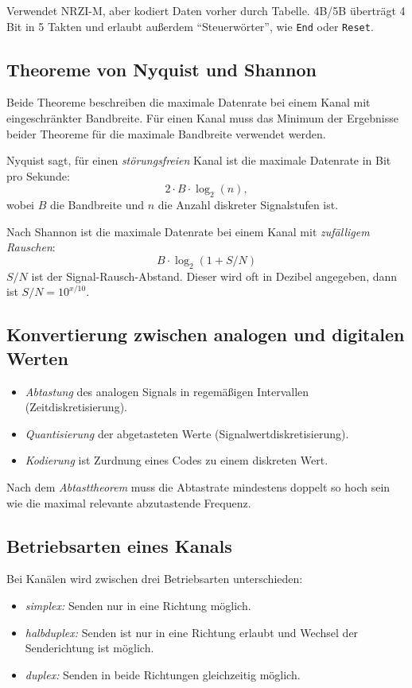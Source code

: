 \documentclass[a4paper,parskip=half*,DIV=15,fontsize=11pt]{scrartcl}
\begin{document}
Verwendet NRZI-M, aber kodiert Daten vorher durch Tabelle. 4B/5B überträgt 4 Bit in 5 Takten und erlaubt außerdem ``Steuerwörter'', wie \lstinline{End} oder \lstinline{Reset}.

\subsection{Theoreme von Nyquist und Shannon}

Beide Theoreme beschreiben die maximale Datenrate bei einem Kanal mit eingeschränkter Bandbreite. Für einen Kanal muss das Minimum der Ergebnisse beider Theoreme für die maximale Bandbreite verwendet werden.

Nyquist sagt, für einen \emph{störungsfreien} Kanal ist die maximale Datenrate in Bit pro Sekunde:
\[2 \cdot B \cdot \log_2(n),\] wobei $B$ die Bandbreite und $n$ die Anzahl diskreter Signalstufen ist.

Nach Shannon ist die maximale Datenrate bei einem Kanal mit \emph{zufälligem Rauschen}:
\[B \cdot \log_2(1 + S/N)\]
$S/N$ ist der Signal-Rausch-Abstand. Dieser wird oft in Dezibel angegeben, dann ist $S/N = 10^{x/10}$.

\subsection{Konvertierung zwischen analogen und digitalen Werten}

\begin{itemize}
\item \emph{Abtastung} des analogen Signals in regemäßigen Intervallen (Zeitdiskretisierung).
\item \emph{Quantisierung} der abgetasteten Werte (Signalwertdiskretisierung).
\item \emph{Kodierung} ist Zurdnung eines Codes zu einem diskreten Wert.
\end{itemize}

Nach dem \emph{Abtasttheorem} muss die Abtastrate mindestens doppelt so hoch sein wie die maximal relevante abzutastende Frequenz.

\subsection{Betriebsarten eines Kanals}

Bei Kanälen wird zwischen drei Betriebsarten unterschieden:

\begin{itemize}
\item \emph{simplex:} Senden nur in eine Richtung möglich.
\item \emph{halbduplex:} Senden ist nur in eine Richtung erlaubt und Wechsel der Senderichtung ist möglich.
\item \emph{duplex:} Senden in beide Richtungen gleichzeitig möglich.
\end{itemize}
\end{document}
